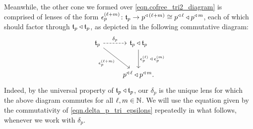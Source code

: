 \documentclass[Book-Poly]{subfiles}
\begin{document}
Meanwhile, the other cone we formed over \eqref{eqn.cofree_tri2_diagram} is comprised of lenses of the form $\epsilon^{(\ell+m)}_p\colon\mathfrak{t}_p\to p^{\mathbin{\triangleleft}\,(\ell+m)}\cong p^{\mathbin{\triangleleft}\,\ell}\mathbin{\triangleleft} p^{\mathbin{\triangleleft}\,m}$, each of which should factor through $\mathfrak{t}_p\mathbin{\triangleleft}\mathfrak{t}_p$, as depicted in the following commutative diagram:
\begin{equation} \label{eqn.delta_p_tri_epsilons}
\begin{tikzcd}[row sep=large]
    \ema{t}_p \ar[r,dashed,"\delta_p"] \ar[dr,"\epsilon^{(\ell+m)}_p"'] & \ema{t}_p\tri\ema{t}_p \ar[d,"\epsilon^{(\ell)}_p\:\tri\:\epsilon^{(m)}_p"] \\
    & p\tripow{\ell}\tri p\tripow{m}.
\end{tikzcd}
\end{equation}
Indeed, by the universal property of $\mathfrak{t}_p\mathbin{\triangleleft}\mathfrak{t}_p$, our $\delta_p$ is the unique lens for which the above diagram commutes for all $\ell,m\in\mathbb{N}$.
We will use the equation given by the commutativity of \eqref{eqn.delta_p_tri_epsilons} repeatedly in what follows, whenever we work with $\delta_p$.
\end{document}

